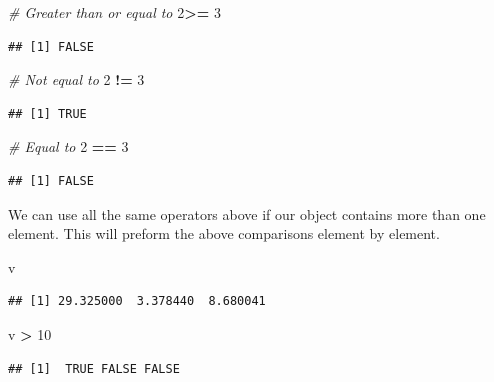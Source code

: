 \documentclass[
]{book}
\newenvironment{Shaded}{\begin{snugshade}}{\end{snugshade}}
\newcommand{\CommentTok}[1]{\textcolor[rgb]{0.56,0.35,0.01}{\textit{#1}}}
\newcommand{\DecValTok}[1]{\textcolor[rgb]{0.00,0.00,0.81}{#1}}
\newcommand{\NormalTok}[1]{#1}
\newcommand{\OperatorTok}[1]{\textcolor[rgb]{0.81,0.36,0.00}{\textbf{#1}}}
\newcommand{\StringTok}[1]{\textcolor[rgb]{0.31,0.60,0.02}{#1}}
\begin{document}
\begin{Shaded}
\begin{Highlighting}[]
\CommentTok{# Greater than or equal to }
\DecValTok{2}\OperatorTok{>=}\StringTok{ }\DecValTok{3}
\end{Highlighting}
\end{Shaded}

\begin{verbatim}
## [1] FALSE
\end{verbatim}

\begin{Shaded}
\begin{Highlighting}[]
\CommentTok{# Not equal to }
\DecValTok{2} \OperatorTok{!=}\StringTok{ }\DecValTok{3}
\end{Highlighting}
\end{Shaded}

\begin{verbatim}
## [1] TRUE
\end{verbatim}

\begin{Shaded}
\begin{Highlighting}[]
\CommentTok{# Equal to }
\DecValTok{2} \OperatorTok{==}\StringTok{ }\DecValTok{3}
\end{Highlighting}
\end{Shaded}

\begin{verbatim}
## [1] FALSE
\end{verbatim}

We can use all the same operators above if our object contains more than one element. This will preform the above comparisons element by element.

\begin{Shaded}
\begin{Highlighting}[]
\NormalTok{v}
\end{Highlighting}
\end{Shaded}

\begin{verbatim}
## [1] 29.325000  3.378440  8.680041
\end{verbatim}

\begin{Shaded}
\begin{Highlighting}[]
\NormalTok{v }\OperatorTok{>}\StringTok{ }\DecValTok{10}
\end{Highlighting}
\end{Shaded}

\begin{verbatim}
## [1]  TRUE FALSE FALSE
\end{verbatim}
\end{document}

